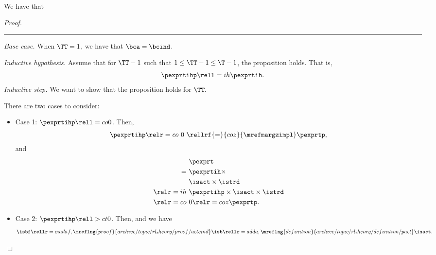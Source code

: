 \begin{proposition}
  We have that %
\end{proposition}

\begin{proof}
  \hrule
  {\it Base case.}
  When $\TT = 1$,
  we have  that
  $\bca = \bcind$.

  \serule
  {\it Inductive hypothesis.}
  Assume that for $\TT - 1$ such that $1 \le \TT - 1 \le \T - 1$,
  the proposition holds. That is,
  $$ \pexprtihp \rell = ih \pexprtih.$$%
  \srule
  {\it Inductive step.}
  We want to show that the proposition holds for $\TT.$

  There are two cases to consider:
  \begin{itemize}
    \item Case 1: $\pexprtihp \rell = co 0$. 
      Then,
      $$\pexprtihp \relr = co \ 0\  \rellrf{=}{coz}{\mrefmargzimpl} \pexprtp,$$
      and
      \begin{align*}
        &\pexprt \\
        =\ &\pexprtih \times \\
        &\isact \times \istrd\\
        \relr = ih \ & \pexprtihp \times \isact \times \istrd \\
        \relr = co \ & 0 \relr = coz \pexprtp.
      \end{align*}
    \item Case 2: $\pexprtihp \rell > ct 0$. 
      Then, 
      and we have
      $$\isbf \rellr = cia daf,\mreflng{proof}{archive/topic/rl_theory/proof/actcind} \isb 
      \rellr = ad da,\mreflng{definition}{archive/topic/rl_theory/definition/pact} \isact.$$


\end{itemize}
\end{proof}

